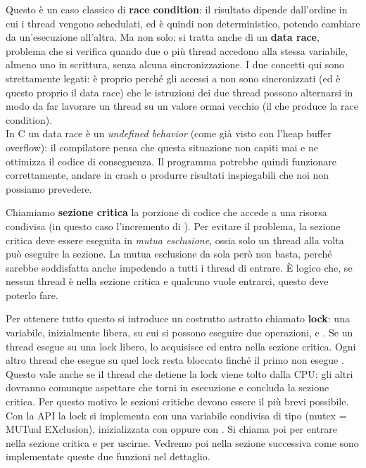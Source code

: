 \documentclass[11pt, a4paper, titlepage, oneside]{scrbook}
\begin{document}
Questo è un caso classico di \textbf{race condition}: il risultato dipende dall'ordine in cui i thread vengono schedulati, ed è quindi non deterministico, potendo cambiare da un'esecuzione all'altra. Ma non solo: si tratta anche di un \textbf{data race}, problema che si verifica quando due o più thread accedono alla stessa variabile, almeno uno in scrittura, senza alcuna sincronizzazione. I due concetti qui sono strettamente legati: è proprio perché gli accessi a  non sono sincronizzati (ed è questo proprio il data race) che le istruzioni dei due thread possono alternarsi in modo da far lavorare un thread su un valore ormai vecchio (il che produce la race condition). \\
\NB In C un data race è un \textit{undefined behavior} (come già visto con l'heap buffer overflow): il compilatore pensa che questa situazione non capiti mai e ne ottimizza il codice di conseguenza. Il programma potrebbe quindi funzionare correttamente, andare in crash o produrre risultati inspiegabili che noi non possiamo prevedere.

Chiamiamo \textbf{sezione critica} la porzione di codice che accede a una risorsa condivisa (in questo caso l'incremento di ). Per evitare il problema, la sezione critica deve essere eseguita in \textit{mutua esclusione}, ossia solo un thread alla volta può eseguire la sezione. La mutua esclusione da sola però non basta, perché sarebbe soddisfatta anche impedendo a tutti i thread di entrare. È logico che, se nessun thread è nella sezione critica e qualcuno vuole entrarci, questo deve poterlo fare.

Per ottenere tutto questo si introduce un costrutto astratto chiamato \textbf{lock}: una variabile, inizialmente libera, su cui si possono eseguire due operazioni,  e . Se un thread esegue  su una lock libero, lo acquisisce ed entra nella sezione critica. Ogni altro thread che esegue  su quel lock resta bloccato finché il primo non esegue . Questo vale anche se il thread che detiene la lock viene tolto dalla CPU: gli altri dovranno comunque aspettare che torni in esecuzione e concluda la sezione critica. Per questo motivo le sezioni critiche devono essere il più brevi possibile. \\
Con la  API la lock si implementa con una variabile condivisa di tipo  (mutex = MUTual EXclusion), inizializzata con  oppure con . Si chiama poi  per entrare nella sezione critica e  per uscirne. Vedremo poi nella sezione successiva come sono implementate queste due funzioni nel dettaglio.
\end{document}
